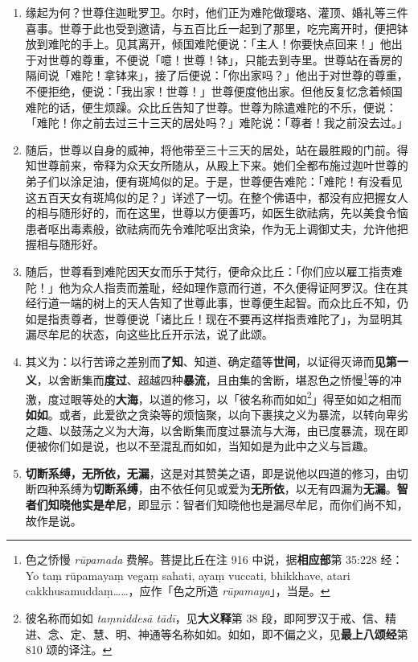 \begin{enumerate}\item 缘起为何？世尊住迦毗罗卫。尔时，他们正为难陀做璎珞、灌顶、婚礼等三件喜事。世尊于此也受到邀请，与五百比丘一起到了那里，吃完离开时，便把钵放到难陀的手上。见其离开，倾国难陀便说：「主人！你要快点回来！」他出于对世尊的尊重，不便说「噫！世尊！钵」，只能去到寺里。世尊站在香房的隔间说「难陀！拿钵来」，接了后便说：「你出家吗？」他出于对世尊的尊重，不便拒绝，便说：「我出家！世尊！」世尊便度他出家。但他反复忆念着倾国难陀的话，便生烦躁。众比丘告知了世尊。世尊为除遣难陀的不乐，便说：「难陀！你之前去过三十三天的居处吗？」难陀说：「尊者！我之前没去过。」
\item 随后，世尊以自身的威神，将他带至三十三天的居处，站在最胜殿的门前。得知世尊前来，帝释为众天女所随从，从殿上下来。她们全都布施过迦叶世尊的弟子们以涂足油，便有斑鸠似的足。于是，世尊便告难陀：「难陀！有没看见这五百天女有斑鸠似的足？」详述了一切。在整个佛语中，都没有应把握女人的相与随形好的，而在这里，世尊以方便善巧，如医生欲祛病，先以美食令恼患者呕出毒素般，欲祛病而先令难陀呕出贪染，作为无上调御丈夫，允许他把握相与随形好。
\item 随后，世尊看到难陀因天女而乐于梵行，便命众比丘：「你们应以雇工指责难陀！」他为众人指责而羞耻，经如理作意而行道，不久便得证阿罗汉。住在其经行道一端的树上的天人告知了世尊此事，世尊便生起智。而众比丘不知，仍如是指责尊者，世尊便说「诸比丘！现在不要再这样指责难陀了」，为显明其漏尽牟尼的状态，向这些比丘开示法，说了此颂。
\item 其义为：以行苦谛之差别而\textbf{了知}、知道、确定蕴等\textbf{世间}，以证得灭谛而\textbf{见第一义}，以舍断集而\textbf{度过}、超越四种\textbf{暴流}，且由集的舍断，堪忍色之㤭慢\footnote{色之㤭慢 \textit{rūpamada} 费解。菩提比丘在注 916 中说，据\textbf{相应部}第 35:228 经：Yo taṃ rūpamayaṃ vegaṃ sahati, ayaṃ vuccati, bhikkhave, atari cakkhusamuddaṃ……，应作「色之所造 \textit{rūpamaya}」，当是。}等的冲激，度过眼等处的\textbf{大海}，以道的修习，以「彼名称而如如\footnote{彼名称而如如 \textit{taṃniddesā tādī}，见\textbf{大义释}第 38 段，即阿罗汉于戒、信、精进、念、定、慧、明、神通等名称如如。如如，即不偏之义，见\textbf{最上八颂经}第 810 颂的译注。}」得至如如之相而\textbf{如如}。或者，此爱欲之贪染等的烦恼聚，以向下裹挟之义为暴流，以转向卑劣之趣、以鼓荡之义为大海，以舍断集而度过暴流与大海，由已度暴流，现在即便被你们如是说，也以不至混乱而如如，当知如是为此中之义与旨趣。
\item \textbf{切断系缚，无所依，无漏}，这是对其赞美之语，即是说他以四道的修习，由切断四种系缚为\textbf{切断系缚}，由不依任何见或爱为\textbf{无所依}，以无有四漏为\textbf{无漏}。\textbf{智者们知晓他实是牟尼}，即显示：智者们知晓他也是漏尽牟尼，而你们尚不知，故作是说。\end{enumerate}

